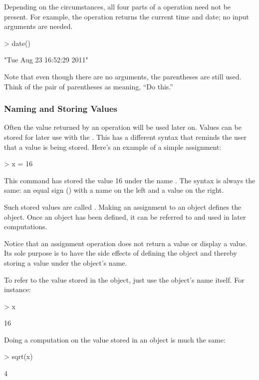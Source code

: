 Depending on the circumstances, all four parts of a
operation need not be present.  For example, the 
operation returns the current time and date; no input arguments are needed.
\begin{Schunk}
\begin{Sinput}
> date()
\end{Sinput}
\begin{Soutput}
[1] "Tue Aug 23 16:52:29 2011"
\end{Soutput}
\end{Schunk}
Note that even though there are no arguments, the parentheses are 
still used.  Think of the pair of parentheses as meaning, ``Do this.''




\subsubsection{Naming and Storing Values}

Often the value returned by an operation will be used later on.
Values can be stored for later use with 
the .  This has a different syntax that
reminds the user that a value is being stored.  Here's an example of a
simple assignment:
\begin{Schunk}
\begin{Sinput}
> x = 16
\end{Sinput}
\end{Schunk}
This command has stored the value 16 under the name .
The syntax is always the same: an equal sign (\code{=}) with a name
on the left and a value on the right.

Such stored values are called .  Making an assignment
to an object defines the object.  Once an object has been
defined, it can be referred to and used in later computations.

Notice that an assignment operation does not return a value or display
a value.  Its sole purpose is to have the side effects of defining the
object and thereby storing a value under the object's name.

To refer to the value stored in the object, 
just use the object's name itself. For instance:
\begin{Schunk}
\begin{Sinput}
> x
\end{Sinput}
\begin{Soutput}
[1] 16
\end{Soutput}
\end{Schunk}
Doing a computation on the value stored in an object is much the same:
\begin{Schunk}
\begin{Sinput}
> sqrt(x)
\end{Sinput}
\begin{Soutput}
[1] 4
\end{Soutput}
\end{Schunk}

